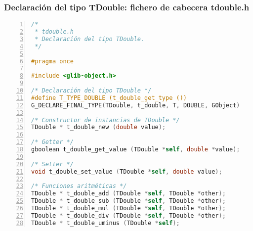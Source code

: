 \subsubsection{Declaración del tipo \textsf{TDouble}: fichero de cabecera \textsf{tdouble.h}}
\begin{lstlisting}[language=C, numbers=left]
/*
 * tdouble.h
 * Declaración del tipo TDouble.
 */

#pragma once

#include <glib-object.h>

/* Declaración del tipo TDouble */
#define T_TYPE_DOUBLE (t_double_get_type ())
G_DECLARE_FINAL_TYPE(TDouble, t_double, T, DOUBLE, GObject)

/* Constructor de instancias de TDouble */
TDouble * t_double_new (double value);

/* Getter */
gboolean t_double_get_value (TDouble *self, double *value);

/* Setter */
void t_double_set_value (TDouble *self, double value);
  
/* Funciones aritméticas */
TDouble * t_double_add (TDouble *self, TDouble *other);
TDouble * t_double_sub (TDouble *self, TDouble *other);
TDouble * t_double_mul (TDouble *self, TDouble *other);
TDouble * t_double_div (TDouble *self, TDouble *other);
TDouble * t_double_uminus (TDouble *self);
\end{lstlisting}

